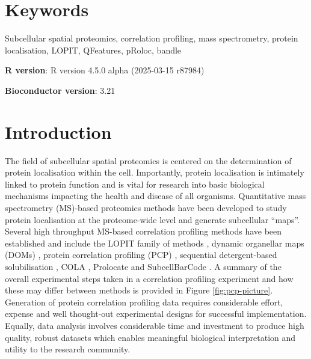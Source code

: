 \documentclass[9pt,a4paper,]{extarticle}
\begin{document}
\section*{Keywords}
Subcellular spatial proteomics, correlation profiling, mass spectrometry, protein localisation,
LOPIT, QFeatures, pRoloc, bandle


\clearpage
\pagestyle{main}

\textbf{R version}: R version 4.5.0 alpha (2025-03-15 r87984)

\textbf{Bioconductor version}: 3.21

\section{Introduction}\label{introduction}

The field of subcellular spatial proteomics is centered on the determination of protein
localisation within the cell. Importantly, protein localisation is
intimately linked to protein function and is vital for research into basic
biological mechanisms impacting the health and disease of all organisms. Quantitative mass
spectrometry (MS)-based proteomics methods have been developed to study protein
localisation at the proteome-wide level and generate subcellular ``maps''.
Several high throughput MS-based correlation profiling methods have been
established and include the LOPIT family of methods \citep{Sadowski2006, Geladaki2019, Christoforou2016},
dynamic organellar maps (DOMs) \citep{Itzhak2016}, protein correlation profiling (PCP) \citep{Foster2006},
sequential detergent-based solubilisation \citep{MartinezVal2021}, COLA \citep{Mardakheh2017},
Prolocate \citep{Jadot2017} and SubcellBarCode \citep{Orre2019}. A summary of the overall
experimental steps taken in a correlation profiling experiment and how these may
differ between methods is provided in Figure \ref{fig:pcp-picture}. Generation of
protein correlation profiling data requires considerable effort, expense and well
thought-out experimental designs for successful implementation. Equally, data
analysis involves considerable time and investment to produce high quality,
robust datasets which enables meaningful biological interpretation and utility to
the research community.
\end{document}
